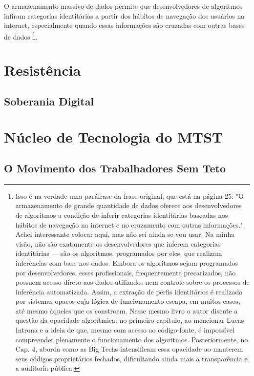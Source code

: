 O armazenamento massivo de dados permite que desenvolvedores de algoritmos infiram categorias identitárias a partir dos hábitos de navegação dos usuários na internet, especialmente quando essas informações são cruzadas com outras bases de dados \cite{silveira-demcodigos}\footnote{Isso é na verdade uma paráfrase da frase original, que está na página 25: 
"O armazenamento de grande quantidade de dados oferece aos desenvolvedores de algoritmos a condição de inferir categorias identitárias baseadas nos hábitos de navegação na internet e no cruzamento com outras informações.". Achei interessante colocar aqui, mas não sei ainda se vou usar. Na minha visão, não são exatamente os desenvolvedores que inferem categorias identitárias — são os algoritmos, programados por eles, que realizam inferências com base nos dados. Embora os algoritmos sejam programados por desenvolvedores, esses profissionais, frequentemente precarizados, não possuem acesso direto aos dados utilizados nem controle sobre os processos de inferência automatizada. Assim, a extração de perfis identitários é realizada por sistemas opacos cuja lógica de funcionamento escapa, em muitos casos, até mesmo àqueles que os constroem. Nesse mesmo livro o autor discute a questão da opacidade algorítmica: no primeiro capítulo, ao mencionar Lucas Introna e a ideia de que, mesmo com acesso ao código-fonte, é impossível compreender plenamente o funcionamento dos algoritmos. Posteriormente, no Cap. 4, aborda como as Big Techs intensificam essa opacidade ao manterem seus códigos proprietários fechados, dificultando ainda mais a transparência e a auditoria pública.}.

\section{Resistência}
\label{sec:resis}

\subsection{Soberania Digital}
\label{subsec:soberania}

\section{Núcleo de Tecnologia do MTST}
\label{sec:nucleomtst}

\subsection{O Movimento dos Trabalhadores Sem Teto }
\label{subsec:mtst}

